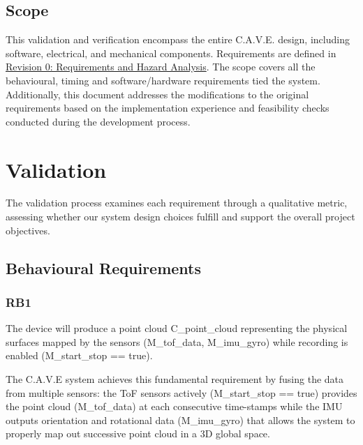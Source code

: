 \documentclass[11pt]{article}
\begin{document}
	\subsection{Scope}
	This validation and verification encompass the entire C.A.V.E. design, including software, electrical, and mechanical components. Requirements are defined in \href{https://github.com/4tb6-cave/capstone/blob/main/docs/HazardAnalysis/HazardAnalysis.pdf}{Revision 0: Requirements and Hazard Analysis}. The scope covers all the behavioural, timing and software/hardware requirements tied the system. Additionally, this document addresses the modifications to the original requirements based on the implementation experience and feasibility checks conducted during the development process.
	
	\section{Validation} 
	
	The validation process examines each requirement through a qualitative metric, assessing whether our system design choices fulfill and support the overall project objectives.
	
	
	\subsection{Behavioural Requirements} 
	
	\subsubsection{RB1} 
	
	\begin{exampleblock}
		The device will produce a point cloud C\_point\_cloud representing the physical surfaces mapped by the sensors (M\_tof\_data, M\_imu\_gyro) while recording is enabled (M\_start\_stop == true).
	\end{exampleblock}
	
	The C.A.V.E system achieves this fundamental requirement by fusing the data from multiple sensors: the ToF sensors actively (M\_start\_stop == true) provides the point cloud (M\_tof\_data) at each consecutive time-stamps while the IMU outputs orientation and rotational data (M\_imu\_gyro) that allows the system to properly map out successive point cloud in a 3D global space.
	
\end{document}
